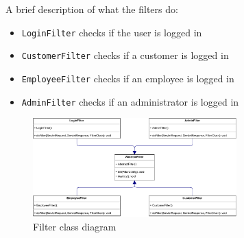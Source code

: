 A brief description of what the filters do:
\begin{itemize}
    \item \texttt{LoginFilter} checks if the user is logged in
    \item \texttt{CustomerFilter} checks if a customer is logged in
    \item \texttt{EmployeeFilter} checks if an employee is logged in
    \item \texttt{AdminFilter} checks if an administrator is logged in
\end{itemize}

\begin{figure}[H]
    \centering
    \includegraphics[width=0.7\textwidth]{Schemas/filter.drawio.pdf}
    \caption{Filter class diagram}
    \label{fig:FilterClassDiagram}
\end{figure}